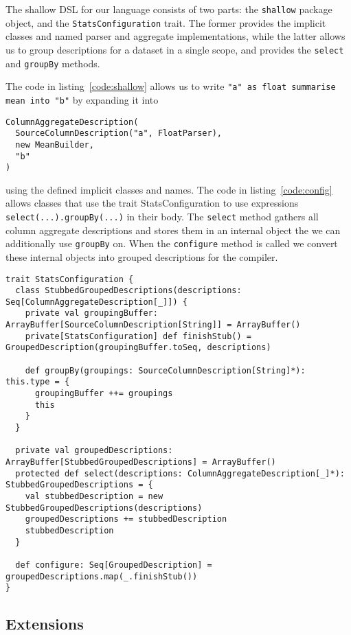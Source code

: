 The shallow DSL for our language consists of two parts: the \texttt{shallow} package object, and the \texttt{StatsConfiguration} trait.
The former provides the implicit classes and named parser and aggregate implementations, while the latter allows us to group descriptions for a dataset in a single scope, and provides the  \texttt{select} and \texttt{groupBy} methods.

The code in listing~\ref{code:shallow} allows us to write \texttt{"a" as float summarise mean into "b"} by expanding it into 
\begin{verbatim}
ColumnAggregateDescription(
  SourceColumnDescription("a", FloatParser),
  new MeanBuilder,
  "b"
)
\end{verbatim}
using the defined implicit classes and names.
The code in listing~\ref{code:config} allows classes that use the trait StatsConfiguration to use expressions \texttt{select(...).groupBy(...)} in their body.
The \texttt{select} method gathers all column aggregate descriptions and stores them in an internal object the we can additionally use \texttt{groupBy} on.
When the \texttt{configure} method is called we convert these internal objects into grouped descriptions for the compiler.

\begin{lstlisting}[caption=StatsConfiguration, label=code:config]
trait StatsConfiguration {
  class StubbedGroupedDescriptions(descriptions: Seq[ColumnAggregateDescription[_]]) {
    private val groupingBuffer: ArrayBuffer[SourceColumnDescription[String]] = ArrayBuffer()
    private[StatsConfiguration] def finishStub() = GroupedDescription(groupingBuffer.toSeq, descriptions)

    def groupBy(groupings: SourceColumnDescription[String]*): this.type = {
      groupingBuffer ++= groupings
      this
    }
  }

  private val groupedDescriptions: ArrayBuffer[StubbedGroupedDescriptions] = ArrayBuffer()
  protected def select(descriptions: ColumnAggregateDescription[_]*): StubbedGroupedDescriptions = {
    val stubbedDescription = new StubbedGroupedDescriptions(descriptions)
    groupedDescriptions += stubbedDescription
    stubbedDescription
  }

  def configure: Seq[GroupedDescription] = groupedDescriptions.map(_.finishStub())
}
\end{lstlisting}

\subsection{Extensions}

